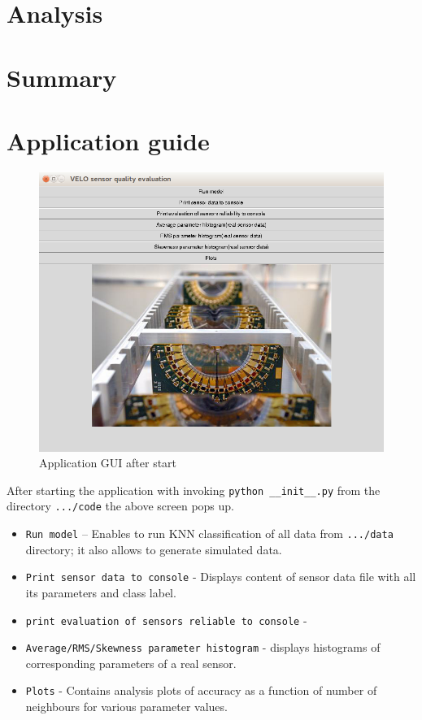 \documentclass[a4paper,10pt]{article}
\begin{document}
\section{Analysis}

\section{Summary}


\appendix
\section{Application guide}

\begin{figure}[H] \centering
    \includegraphics[width=.8\textwidth]{../fig/app_shots/start}
    \caption{Application GUI after start}
\end{figure}

After starting the application with invoking \texttt{python \_\_init\_\_.py} from the directory \texttt{.../code} the above screen pops up.
\begin{itemize}
    \item \texttt{Run model} -- Enables to run KNN classification of all data from \texttt{.../data} directory; it also allows to generate simulated data.
    \item \texttt{Print sensor data to console} - Displays content of sensor data file with all its parameters and class label.
    \item \texttt{print evaluation of sensors reliable to console} - 
    \item \texttt{Average/RMS/Skewness parameter histogram} - displays histograms of corresponding parameters of a real sensor.
    \item \texttt{Plots} - Contains analysis plots of accuracy as a function of number of neighbours for various parameter values.
\end{itemize}
\end{document}
